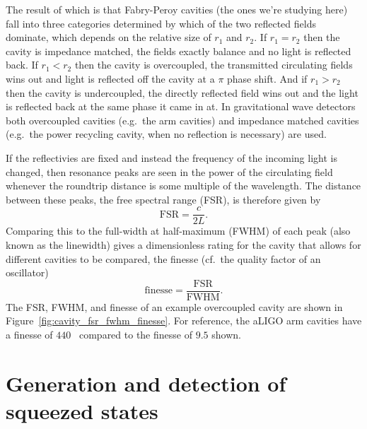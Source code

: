 \documentclass[aps,pra,superscriptaddress,reprint,nofootinbib]{revtex4-1}
\begin{document}
The result of which is that Fabry-Peroy cavities (the ones we’re studying here) fall into three categories determined by which of the two reflected fields dominate, which depends on the relative size of $r_1$ and $r_2$. If $r_1 = r_2$ then the cavity is impedance matched, the fields exactly balance and no light is reflected back. If $r_1 < r_2$ then the cavity is overcoupled, the transmitted circulating fields wins out and light is reflected off the cavity at a $\pi$ phase shift. And if $r_1 > r_2$ then the cavity is undercoupled, the directly reflected field wins out and the light is reflected back at the same phase it came in at. In gravitational wave detectors both overcoupled cavities (e.g.\ the arm cavities) and impedance matched cavities (e.g.\ the power recycling cavity, when no reflection is necessary) are used.


If the reflectivies are fixed and instead the frequency of the incoming light is changed, then resonance peaks are seen in the power of the circulating field whenever the roundtrip distance is some multiple of the wavelength. The distance between these peaks, the free spectral range (FSR), is therefore given by $$\mathrm{FSR} = \frac{c}{2L}.$$ Comparing this to the full-width at half-maximum (FWHM) of each peak (also known as the linewidth) gives a dimensionless rating for the cavity that allows for different cavities to be compared, the finesse (cf.\ the quality factor of an oscillator) $$\mathrm{finesse} = \frac{\mathrm{FSR}}{\mathrm{FWHM}}.$$
The FSR, FWHM, and finesse of an example overcoupled cavity are shown in Figure~\ref{fig:cavity_fsr_fwhm_finesse}.
For reference, the aLIGO arm cavities have a finesse of $440$~\cite{AdvancedLIGO:2015} compared to the finesse of $9.5$ shown.


\section{Generation and detection of squeezed states}
\label{sec:squeezing}
\end{document}
